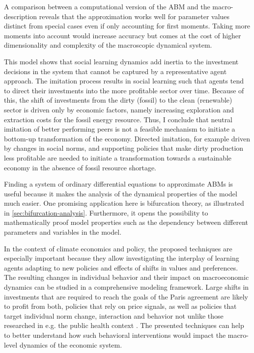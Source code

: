 A comparison between a computational version of the ABM and the macro-description reveals that the approximation works well for parameter values distinct from special cases even if only accounting for first moments. Taking more moments into account would increase accuracy but comes at the cost of higher dimensionality and complexity of the macroscopic dynamical system.

This model shows that social learning dynamics add inertia to the investment decisions in the system that cannot be captured by a representative agent approach.
The imitation process results in social learning such that agents tend to direct their investments into the more profitable sector over time.
Because of this, the shift of investments from the dirty (fossil) to the clean (renewable) sector is driven only by economic factors, namely increasing exploration and extraction costs for the fossil energy resource.
Thus, I conclude that neutral imitation of better performing peers is not a feasible mechanism to initiate a bottom-up transformation of the economy. Directed imitation, for example driven by changes in social norms, and supporting policies that make dirty production less profitable are needed to initiate a transformation towards a sustainable economy in the absence of fossil resource shortage.

Finding a system of ordinary differential equations to approximate ABMs is useful because it makes the analysis of the dynamical properties of the model much easier. One promising application here is bifurcation theory, as illustrated in \cref{sec:bifurcation-analysis}.
Furthermore, it opens the possibility to mathematically proof model properties such as the dependency between different parameters and variables in the model.

In the context of climate economics and policy, the proposed techniques are especially important because they allow investigating the interplay of learning agents adapting to new policies and effects of shifts in values and preferences. The resulting changes in individual behavior and their impact on macroeconomic dynamics can be studied in a comprehensive modeling framework. 
Large shifts in investments that are required to reach the goals of the Paris agreement are likely to profit from both, policies that rely on price signals, as well as policies that target individual norm change, interaction and behavior not unlike those researched in e.g. the public health context \cite{Zhang2016, Zhang2015, Centola2011}. The presented techniques can help to better understand how such behavioral interventions would impact the macro-level dynamics of the economic system.


